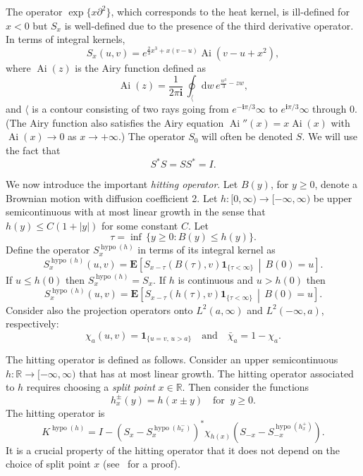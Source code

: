\documentclass[10pt]{amsart}
\theoremstyle{definition}\newtheorem{defi}[theo]{Definition}\newtheorem{rema}[theo]{Remark}\newtheorem{exam}[theo]{Example}\newtheorem{exem}[theo]{Example}\newtheorem{nota}[theo]{Notation}
\newcommand*{\dd}{\mathrm{d}}
\newcommand*{\myangle}{\mathord{\langle}} %
\DeclareMathOperator{\hypo}{hypo}
\DeclareMathOperator{\Ai}{Ai}
\newcommand{\E}[1]{\mathbf{E}\left[#1\right]}
\newcommand{\ind}[1]{\mathbf{1}_{\{ #1 \}}}
\newcommand{\R}{\mathbb{R}}
\begin{document}
The operator $\exp \{x \partial^2\}$, which corresponds to the heat kernel, is ill-defined for $x < 0$ but $S_x$ is well-defined due to the presence of the third derivative operator. In terms of integral kernels,
\begin{equation}\label{eqn:Skernel}
S_x(u,v) = e^{\frac{2}{3}x^3 + x(v-u)} \Ai(v-u + x^2),
\end{equation}
where $\Ai(z)$ is the Airy function defined as
\begin{equation}\label{eqn:Aifunc}
\Ai(z) = \frac{1}{2 \pi \mathbf{i}} \, \oint_{\myangle} \dd w \, e^{\frac{w^3}{3} - z w},
\end{equation}
and $\myangle$ is a contour consisting of two rays going from $e^{-\mathbf{i} \pi/3} \infty$ to $e^{\mathbf{i} \pi/3} \infty$ through 0. (The Airy function also satisfies the Airy equation $\Ai'' (x) = x \Ai(x)$ with $\Ai(x) \to 0$ as $x \to + \infty$.) The operator $S_0$ will often be denoted $S$. We will use the fact that
\[
S^{*} S = S S^{*} = I.
\]

We now introduce the important \emph{hitting operator}. Let $B(y)$, for $y \geq 0$, denote a Brownian motion with diffusion coefficient 2. Let $h : [0,\infty) \to [-\infty, \infty)$ be upper semicontinuous with at most linear growth in the sense that $h(y) \leq C (1+ |y|)$ for some constant $C$. Let
\[
\tau = \inf \, \{ y \geq 0: B(y) \leq h(y)\}.
\]
Define the operator $S^{\hypo(h)}_x$ in terms of its integral kernel as
\begin{equation}\label{eqn:hypokernel}
S^{\hypo(h)}_x(u,v) = \E{S_{x-\tau}(B(\tau),v)\ind{\tau < \infty} \,\middle|\, B(0) = u}.
\end{equation}
If $u \leq h(0)$ then $S^{\hypo(h)}_x = S_x$. If $h$ is continuous and $u > h(0)$ then
\[
S^{\hypo(h)}_x(u,v) = \E{S_{x-\tau}(h(\tau),v)\ind{\tau < \infty} \,\middle|\, B(0) = u}.
\]
Consider also the projection operators onto $L^2(a,\infty)$ and $L^2(-\infty, a)$, respectively:
\begin{equation}\label{eqn:proj}
\chi_a(u,v) = \ind{u = v, \,u > a} \quad \text{and} \quad \bar{\chi}_a = 1 - \chi_a.
\end{equation}

The hitting operator is defined as follows. Consider an upper semicontinuous $h : \R \to [-\infty, \infty)$ that has at most linear growth. The hitting operator associated to $h$ requires choosing a \emph{split point} $x \in \R$. Then consider the functions
\[
h^{\pm}_x(y) = h(x \pm y) \quad \text{for}\;\; y \geq 0.
\]
The hitting operator is
\begin{equation}\label{eqn:hitkernel}
K^{\hypo(h)} = I - \left (S_x - S^{\hypo(h^{-}_x)}_x \right)^{*} \chi_{h(x)}
\left (S_{-x} - S^{\hypo(h^{+}_x)}_{-x}\right).
\end{equation}
It is a crucial property of the hitting operator that it does not depend on the choice of split point $x$ (see~\cite{QR1} for a proof).
\end{document}
